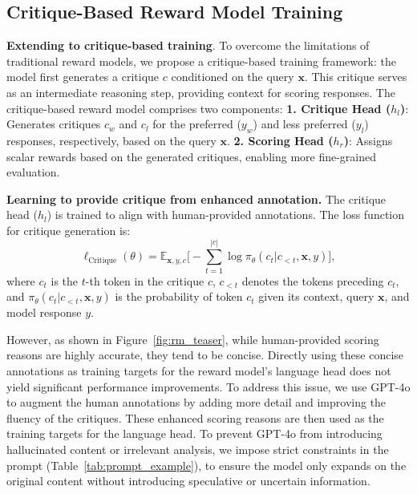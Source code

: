 \subsection{Critique-Based Reward Model Training}

\textbf{Extending to critique-based training}. To overcome the limitations of traditional reward models, we propose a critique-based training framework: the model first generates a critique $c$ conditioned on the query $\mathbf{x}$. This critique serves as an intermediate reasoning step, providing context for scoring responses. The critique-based reward model comprises two components:
\textbf{1. Critique Head ($h_l$)}: Generates critiques $c_w$ and $c_l$ for the preferred ($y_w$) and less preferred ($y_l$) responses, respectively, based on the query $\mathbf{x}$. \textbf{2. Scoring Head ($h_r$)}: Assigns scalar rewards based on the generated critiques, enabling more fine-grained evaluation.

\textbf{Learning to provide critique from enhanced annotation.} The critique head ($h_l$) is trained to align with human-provided annotations. The loss function for critique generation is:
\begin{equation}
\ell_{\text{Critique}}(\theta) = 
\mathbb{E}_{\mathbf{x}, y, c} 
\Big[ 
    - \sum_{t=1}^{|c|} \log \pi_\theta(c_t | c_{<t}, \mathbf{x}, y)
\Big],
\end{equation}
where $c_t$ is the $t$-th token in the critique $c$, $c_{<t}$ denotes the tokens preceding $c_t$, and $\pi_\theta(c_t | c_{<t}, \mathbf{x}, y)$ is the probability of token $c_t$ given its context, query $\mathbf{x}$, and model response $y$.

However, as shown in Figure~\ref{fig:rm_teaser}, while human-provided scoring reasons are highly accurate, they tend to be concise. Directly using these concise annotations as training targets for the reward model's language head does not yield significant performance improvements. To address this issue, we use GPT-4o to augment the human annotations by adding more detail and improving the fluency of the critiques. These enhanced scoring reasons are then used as the training targets for the language head. To prevent GPT-4o from introducing hallucinated content or irrelevant analysis, we impose strict constraints in the prompt (Table~\ref{tab:prompt_example}), to ensure the model only expands on the original content without introducing speculative or uncertain information.



